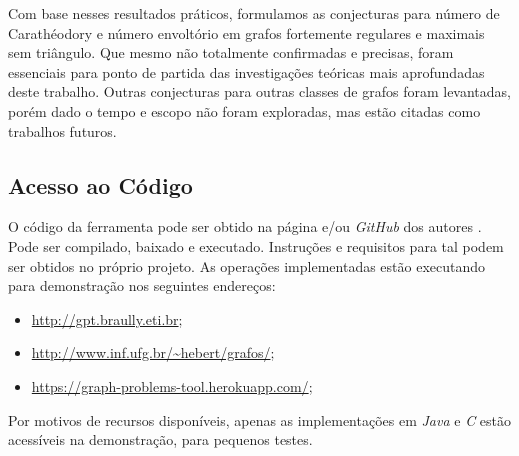Com base nesses resultados práticos, formulamos as conjecturas para número de Carathéodory e número envoltório em grafos fortemente regulares e maximais sem triângulo. Que mesmo não totalmente confirmadas e precisas, foram essenciais para ponto de partida das investigações teóricas mais aprofundadas deste trabalho. Outras conjecturas para outras classes de grafos foram levantadas, porém dado o tempo e escopo não foram exploradas, mas estão citadas como trabalhos futuros.

\subsection{Acesso ao Código}

O código da ferramenta pode ser obtido na página e/ou \textit{GitHub} dos autores \cite{braully2017}. %
Pode ser compilado, baixado e executado. 
Instruções e requisitos para tal podem ser obtidos no próprio projeto. As operações implementadas estão executando para demonstração nos seguintes endereços:
\begin{itemize}
\item \url{http://gpt.braully.eti.br};
\item \url{http://www.inf.ufg.br/~hebert/grafos/};
\item \url{https://graph-problems-tool.herokuapp.com/};
\end{itemize}

Por motivos de recursos disponíveis, apenas as implementações em \textit{Java} e \textit{C} estão acessíveis na demonstração, para pequenos testes.

